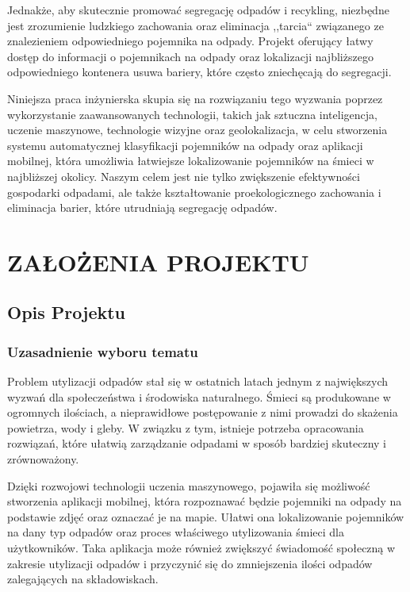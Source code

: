 \documentclass[12pt, a4paper, twoside, openany]{book}
\newcommand{\forceindent}{\leavevmode{\parindent=1.3em\indent}}
\begin{document}
Jednakże, aby skutecznie promować segregację odpadów i recykling, niezbędne jest zrozumienie ludzkiego zachowania oraz eliminacja ,,tarcia`` związanego ze znalezieniem odpowiedniego pojemnika na odpady. Projekt oferujący łatwy dostęp do informacji o pojemnikach na odpady oraz lokalizacji najbliższego odpowiedniego kontenera usuwa bariery, które często zniechęcają do segregacji.

Niniejsza praca inżynierska skupia się na rozwiązaniu tego wyzwania poprzez wykorzystanie zaawansowanych technologii, takich jak sztuczna inteligencja, uczenie maszynowe, technologie wizyjne oraz geolokalizacja, w celu stworzenia systemu automatycznej klasyfikacji pojemników na odpady oraz aplikacji mobilnej, która umożliwia łatwiejsze lokalizowanie pojemników na śmieci w najbliższej okolicy. Naszym celem jest nie tylko zwiększenie efektywności gospodarki odpadami, ale także kształtowanie proekologicznego zachowania i eliminacja barier, które utrudniają segregację odpadów.

\chapter{\MakeUppercase{Założenia projektu}}

\section{Opis Projektu}

\subsection{Uzasadnienie wyboru tematu}

\forceindent Problem utylizacji odpadów stał się w ostatnich latach jednym z największych wyzwań dla społeczeństwa i środowiska naturalnego. Śmieci są produkowane w ogromnych ilościach, a nieprawidłowe postępowanie z nimi prowadzi do skażenia powietrza, wody i gleby. W związku z tym, istnieje potrzeba opracowania rozwiązań, które ułatwią zarządzanie odpadami w sposób bardziej skuteczny i zrównoważony.

Dzięki rozwojowi technologii uczenia maszynowego, pojawiła się możliwość stworzenia aplikacji mobilnej, która rozpoznawać będzie pojemniki na odpady na podstawie zdjęć oraz oznaczać je na mapie. Ułatwi ona lokalizowanie pojemników na dany typ odpadów oraz proces właściwego utylizowania śmieci dla użytkowników. Taka aplikacja może również zwiększyć świadomość społeczną w zakresie utylizacji odpadów i przyczynić się do zmniejszenia ilości odpadów zalegających na składowiskach.
\end{document}
